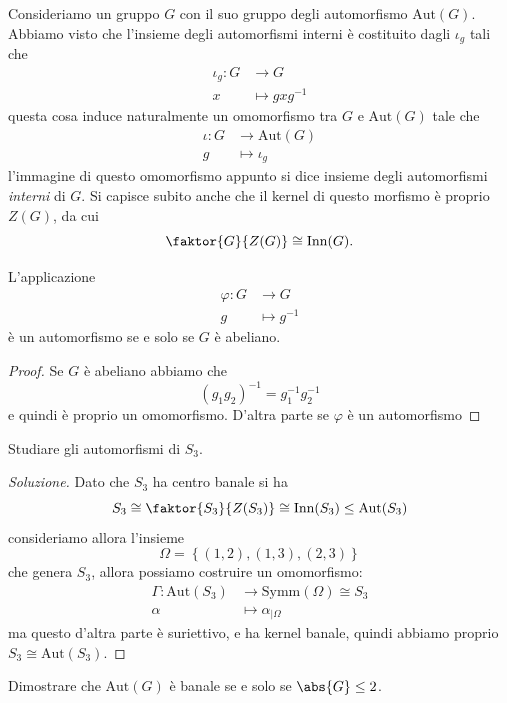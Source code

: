 \documentclass[11pt]{scrartcl}
\begin{document}
	 Consideriamo un gruppo $G$ con il suo gruppo degli automorfismo $\text{Aut}(G)$. Abbiamo visto che l'insieme degli automorfismi interni è costituito dagli $\iota_g$ tali che
	 \begin{align*}
	 	\iota_g:G & \to G \\
	 	x & \mapsto gxg^{-1}
	 \end{align*}
	 questa cosa induce naturalmente un omomorfismo tra $G$ e $\text{Aut}(G)$ tale che
	 \begin{align*}
	 	\iota:G & \to \text{Aut}(G) \\
	 	g & \mapsto \iota_g
	 \end{align*}
	 l'immagine di questo omomorfismo appunto si dice insieme degli automorfismi \textit{interni} di $G$. Si capisce subito anche che il kernel di questo morfismo è proprio $Z(G)$, da cui
	 $$\faktor{G}{Z(G)}\cong \text{Inn}(G).$$
	\begin{proposition}
		L'applicazione 
		\begin{align*}
			\varphi:G & \to G \\
			g & \mapsto g^{-1}
		\end{align*}
		è un automorfismo se e solo se $G$ è abeliano.
	\end{proposition}
	\begin{proof}
		Se $G$ è abeliano abbiamo che 
		$$\left(g_1g_2\right)^{-1}=g_1^{-1}g_2^{-1}$$
		e quindi è proprio un omomorfismo. D'altra parte se $\varphi$ è un automorfismo
	\end{proof}
	\begin{exercise}
		Studiare gli automorfismi di $S_3$.
	\end{exercise}
	\begin{proof}[Soluzione]
		Dato che $S_3$ ha centro banale si ha
		$$S_3\cong \faktor{S_3}{Z(S_3)}\cong\text{Inn}(S_3)\le \text{Aut}(S_3)$$
		consideriamo allora l'insieme
		$$\Omega=\left\{\left(1,2\right),\left(1,3\right),\left(2,3\right)\right\}$$
		che genera $S_3$, allora possiamo costruire un omomorfismo:
		\begin{align}
			\Gamma:\text{Aut}(S_3) & \to \text{Symm}(\Omega)\cong S_3 \\
			\alpha & \mapsto \alpha_{\mid \Omega} 
		\end{align}
		ma questo d'altra parte è suriettivo, e ha kernel banale, quindi abbiamo proprio $S_3\cong \text{Aut}(S_3)$.
	\end{proof}
	\begin{exercise}
		Dimostrare che $\text{Aut}(G)$ è banale se e solo se $\abs{G}\le 2$.
	\end{exercise}
\end{document}
